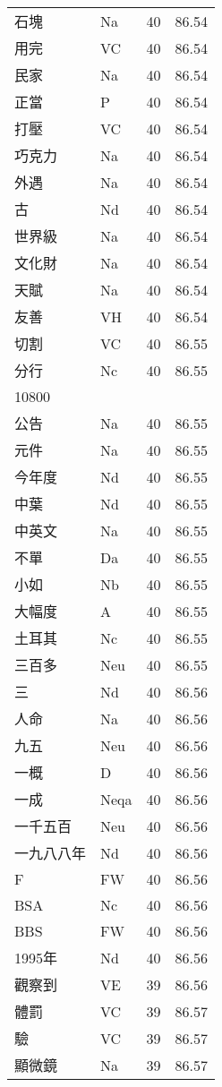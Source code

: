 \documentclass[twocolumn]{book}
\begin{document}
\begin{supertabular}{llrr}
石塊 & Na & 40 &  86.54\\
用完 & VC & 40 &  86.54\\
民家 & Na & 40 &  86.54\\
正當 & P & 40 &  86.54\\
打壓 & VC & 40 &  86.54\\
巧克力 & Na & 40 &  86.54\\
外遇 & Na & 40 &  86.54\\
古 & Nd & 40 &  86.54\\
世界級 & Na & 40 &  86.54\\
文化財 & Na & 40 &  86.54\\
天賦 & Na & 40 &  86.54\\
友善 & VH & 40 &  86.54\\
切割 & VC & 40 &  86.55\\
分行 & Nc & 40 &  86.55\\
10800\\
公告 & Na & 40 &  86.55\\
元件 & Na & 40 &  86.55\\
今年度 & Nd & 40 &  86.55\\
中葉 & Nd & 40 &  86.55\\
中英文 & Na & 40 &  86.55\\
不單 & Da & 40 &  86.55\\
小如 & Nb & 40 &  86.55\\
大幅度 & A & 40 &  86.55\\
土耳其 & Nc & 40 &  86.55\\
三百多 & Neu & 40 &  86.55\\
三 & Nd & 40 &  86.56\\
人命 & Na & 40 &  86.56\\
九五 & Neu & 40 &  86.56\\
一概 & D & 40 &  86.56\\
一成 & Neqa & 40 &  86.56\\
一千五百 & Neu & 40 &  86.56\\
一九八八年 & Nd & 40 &  86.56\\
F & FW & 40 &  86.56\\
BSA & Nc & 40 &  86.56\\
BBS & FW & 40 &  86.56\\
1995年 & Nd & 40 &  86.56\\
觀察到 & VE & 39 &  86.56\\
體罰 & VC & 39 &  86.57\\
驗 & VC & 39 &  86.57\\
顯微鏡 & Na & 39 &  86.57\\

\end{supertabular}
\end{document}
